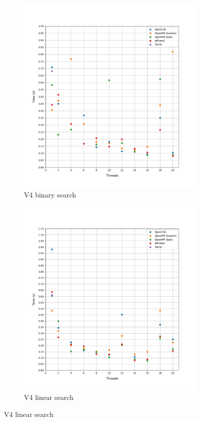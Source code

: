 \documentclass[12pt, a4paper]{article}
\begin{document}
\begin{figure}[h!]
\begin{subfigure}[b]{0.33\textwidth}
         \includegraphics[height=.4\textheight, width=\textwidth, keepaspectratio]{assets/NACA0015/v4_binary.png}
         \caption{V4 binary search}
     \end{subfigure}
     \begin{subfigure}[b]{0.33\textwidth}
         \centering
         \includegraphics[height=.4\textheight, width=\textwidth, keepaspectratio]{assets/NACA0015/v4_linear.png}
         \caption{V4 linear search} 
     \end{subfigure}
\end{figure}
\end{document}
